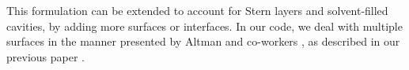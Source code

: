 This formulation can be extended to account for Stern layers and solvent-filled cavities, by adding more surfaces or interfaces. In our code, we deal with multiple surfaces in the manner presented by Altman and co-workers \cite{AltmanBardhanWhiteTidor09}, as described in our previous paper \cite{CooperBardhanBarba2013}.



 \begin{comment}
 
Figure \ref{fig:molecule_surface_stern} shows a more interesting situation. There, the surface $\Gamma_3$ has a given potential $\phi_0$ with a Stern layer, and interacts with a molecule that has a pocket of solvent, where the linearized Poisson-Boltzmann equation is enforced. In this case, the derivation that led to Equation \eqref{eq:matrix_phi} yields
 
 \newpage
 

\end{comment}
